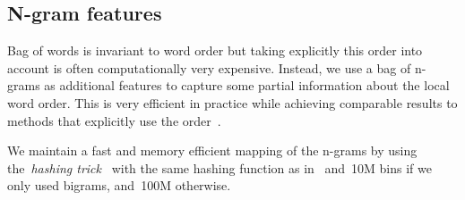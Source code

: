 \documentclass[11pt,letterpaper]{article}
\begin{document}
\subsection{N-gram features}

Bag of words is invariant to word order but taking explicitly this order into
account is often computationally very expensive. Instead, we use a bag of n-grams
as additional features to capture some partial information about
the local word order. This is very efficient in practice while
achieving comparable results to methods that explicitly use the
order~\cite{wang2012baselines}.

We maintain a fast and memory efficient mapping of the n-grams by using
the~\emph{hashing trick}~\cite{weinberger2009feature} with the same hashing
function as in~ and~10M bins if we only used
bigrams, and~100M otherwise. 








\end{document}

